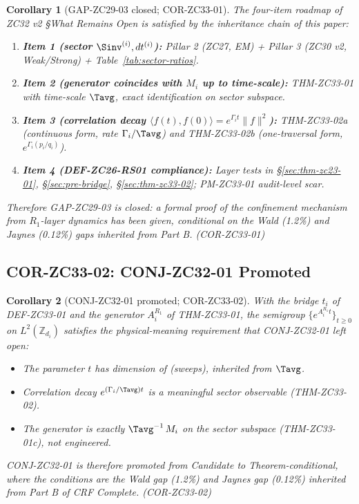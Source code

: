 \documentclass[12pt, a4paper]{article}
\newtheorem{corollary}{Corollary}[section]
\begin{document}
\begin{corollary}[GAP-ZC29-03 closed; COR-ZC33-01]
\label{cor:zc33-01}
The four-item roadmap of ZC32 v2 §What Remains Open is
satisfied by the inheritance chain of this paper:
\begin{enumerate}[leftmargin=*, noitemsep]
\item \textbf{Item 1 (sector $\Sinv^{(i)}, dt^{(i)}$):}
  Pillar 2 (ZC27, EM) + Pillar 3 (ZC30 v2, Weak/Strong)
  + Table~\ref{tab:sector-ratios}.
\item \textbf{Item 2 (generator coincides with $M_i$ up to
  time-scale):} THM-ZC33-01 with time-scale $\Tavg$, exact
  identification on sector subspace.
\item \textbf{Item 3 (correlation decay $\langle f(t), f(0)
  \rangle = e^{\Gamma_i t}\|f\|^2$):} THM-ZC33-02a (continuous
  form, rate $\Gamma_i/\Tavg$) and THM-ZC33-02b (one-traversal
  form, $e^{\Gamma_i(p_i/q_i)}$).
\item \textbf{Item 4 (DEF-ZC26-RS01 compliance):} Layer tests
  in §\ref{sec:thm-zc23-01}, §\ref{sec:pre-bridge},
  §\ref{sec:thm-zc33-02}; PM-ZC33-01 audit-level scar.
\end{enumerate}

Therefore GAP-ZC29-03 is closed: a formal proof of the
confinement mechanism from $R_1$-layer dynamics has been
given, conditional on the Wald (1.2\%) and Jaynes (0.12\%)
gaps inherited from Part B.
\hfill\textup{(COR-ZC33-01)}
\end{corollary}

\subsection{COR-ZC33-02: CONJ-ZC32-01 Promoted}
\label{sec:cor-zc33-02}

\begin{corollary}[CONJ-ZC32-01 promoted; COR-ZC33-02]
\label{cor:zc33-02}
With the bridge $t_i$ of DEF-ZC33-01 and the generator
$A_i^{R_1}$ of THM-ZC33-01, the semigroup
$\{e^{A_i^{R_1} t}\}_{t\geq 0}$ on $L^2(\mathbb{Z}_{d_i})$
satisfies the physical-meaning requirement that
CONJ-ZC32-01 left open:
\begin{itemize}[leftmargin=*, noitemsep]
\item The parameter $t$ has dimension of (sweeps),
  inherited from $\Tavg$.
\item Correlation decay $e^{(\Gamma_i/\Tavg) t}$ is a
  meaningful sector observable (THM-ZC33-02).
\item The generator is exactly $\Tavg^{-1}\,M_i$ on the
  sector subspace (THM-ZC33-01c), not engineered.
\end{itemize}
CONJ-ZC32-01 is therefore promoted from Candidate to
Theorem-conditional, where the conditions are the Wald gap
(1.2\%) and Jaynes gap (0.12\%) inherited from Part B
of CRF Complete.
\hfill\textup{(COR-ZC33-02)}
\end{corollary}
\end{document}
